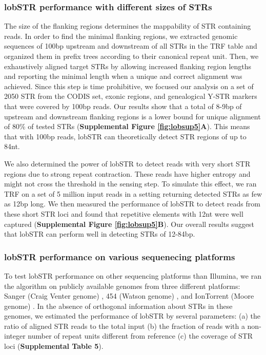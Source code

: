 {\subsubsection{lobSTR performance with different sizes of STRs}
The size of the flanking regions determines the mappability of STR containing reads. In order to find the minimal flanking regions, we extracted genomic sequences of 100bp upstream and downstream of all STRs in the TRF table and organized them in prefix trees according to their canonical repeat unit. Then, we exhaustively aligned target STRs by allowing increased flanking region lengths and reporting the minimal length when a unique and correct alignment was achieved. Since this step is time prohibitive, we focused our analysis on a set of 2050 STR from the CODIS set, exonic regions, and genealogical Y-STR markers that were covered by 100bp reads. Our results show that a total of 8-9bp of upstream and downstream flanking regions is a lower bound for unique alignment of 80\% of tested STRs (\textbf{Supplemental Figure \ref{fig:lobsup5}A}). This means that with 100bp reads, lobSTR can theoretically detect STR regions of up to 84nt.  

We also determined the power of lobSTR to detect reads with very short STR regions due to strong repeat contraction. These reads have higher entropy and might not cross the threshold in the sensing step. To simulate this effect, we ran TRF on a set of 5 million input reads in a setting returning detected STRs as few as 12bp long. We then measured the performance of lobSTR to detect reads from these short STR loci and found that repetitive elements with 12nt were well captured (\textbf{Supplemental Figure \ref{fig:lobsup5}B}). Our overall results suggest that lobSTR can perform well in detecting STRs of 12-84bp. 

\subsubsection{lobSTR performance on various sequenecing platforms}
To test lobSTR performance on other sequencing platforms than Illumina, we ran the algorithm on publicly available genomes from three different platforms: Sanger (Craig Venter genome) \cite{LevySuttonNgEtAl2007}, 454 (Watson genome) \cite{WheelerSrinivasanEgholmEtAl2008}, and IonTorrent (Moore genome) \cite{RothbergHinzRearickEtAl2011}. In the absence of orthogonal information about STRs in these genomes, we estimated the performance of lobSTR by several parameters: (a) the ratio of aligned STR reads to the total input (b) the fraction of reads with a non-integer number of repeat units different from reference (c) the coverage of STR loci (\textbf{Supplemental Table 5}).

}
